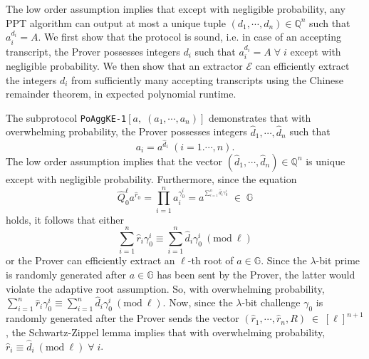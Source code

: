 \documentclass[11pt, lettersize, notitlepage, leqno, footskip=0.6cm]{article}
\newcommand{\bq}{\mathbb Q}
\newcommand{\pl}{\prod\limits}
\newcommand{\slim}{\sum\limits}
\newcommand{\bG}{\mathbb{G}}
\newcommand{\mc}{\mathcal}
\newcommand{\lam}{\lambda}
\newcommand{\what}{\widehat}
\newcommand{\vs}{\vspace{-0.15cm}}
\newcommand{\op}{overwhelming probability}
\newcommand{\np}{negligible probability}
\newcommand{\Mod}[1]{\ (\mathrm{mod}\ #1)}
\newcommand{\E}{\mc{E}}
\numberwithin{equation}{section}
\begin{document}
\begin{prf} The low order assumption implies that except with \np, any PPT algorithm can output at most a unique tuple $(d_1,\cdots,d_n)\in\bq^n$ such that $a_i^{d_i} = A$. We first show that the protocol is sound, i.e. in case of an accepting transcript, the Prover possesses integers $d_i$ such that $a_i^{d_i} = A\;\forall\; i$ except with \np. We then show that an extractor $\E$ can efficiently extract the integers $d_i$ from sufficiently many accepting transcripts using the Chinese remainder theorem, in expected polynomial runtime.

The subprotocol \verb|PoAggKE-1|$[a,\;(a_1,\cdots,a_n)]$ demonstrates that with \op, the Prover possesses integers $\what{d}_1,\cdots,\what{d}_n$ such that \vs $$a_i = a^{\what{d}_i}\; (i=1.\cdots,n).$$ The low order assumption implies that the vector $(\what{d}_1,\cdots,\what{d}_n)\in\bq^n$ is unique except with \np. Furthermore, since the equation \vs $$\what{Q}_0^{\ell}a^{\what{r}_0} = \pl_{i=1}^{n} a_i^{\gamma_{0}^i}  = a^{^{\slim_{i=1}^n \what{d}_i\gamma_{0}^i}}\;\in\;\bG$$ holds, it follows that either \vs $$\slim_{i=1}^n\what{r}_i\gamma_{0}^i\equiv \slim_{i=1}^n \what{d}_i\gamma_{0}^i\Mod{\ell}$$ or the Prover can efficiently extract an $\ell$-th root of $a\in\bG$. Since the $\lam$-bit prime is randomly generated after $a\in\bG$ has been sent by the Prover, the latter would violate the adaptive root assumption. So, with \op, $\slim_{i=1}^n\what{r}_i\gamma_{0}^i\equiv \slim_{i=1}^n \what{d}_i\gamma_{0}^i\Mod{\ell}.$ Now, since the $\lam$-bit challenge $\gamma_{0}$ is randomly generated after the Prover sends the vector $(\what{r}_1,\cdots,\what{r}_n, R)\;\in\;[\ell]^{n+1}$, the Schwartz-Zippel lemma implies that with \op, $\what{r}_i\equiv \what{d}_i\Mod{\ell}\;\forall\; i$. 


\end{prf}
\end{document}
